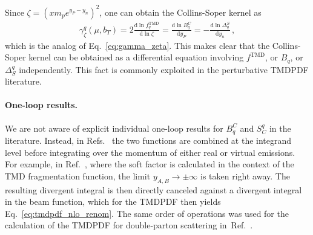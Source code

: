 \documentclass[11pt,a4paper]{article}
\DeclareRobustCommand{\eq}[1]{Eq.~\eqref{eq:#1}}
\DeclareRobustCommand{\mycite}[1]{Ref.~\cite{#1}}
\DeclareRobustCommand{\mycites}[1]{Refs.~\cite{#1}}
\newcommand{\df}{\mathrm{d}}
\newcommand\TMD{\mathrm{TMD}}
\begin{document}
Since $\zeta = (x m_p e^{y_P-y_n})^2$, one can obtain the Collins-Soper kernel as
\begin{align}
 \gamma_\zeta^q(\mu,b_T) = 2 \frac{\df\ln f^\TMD_q}{\df\ln\zeta} = \frac{\df\ln B_q^C}{\df y_P} = -\frac{\df\ln \Delta_q^S}{\df y_n}
\,,\end{align}
which is the analog of \eq{gamma_zeta}.
This makes clear that the Collins-Soper kernel can be obtained as a differential equation involving $f^\TMD$, or $B_q$, or $\Delta_S^q$ independently. This fact is commonly exploited in the perturbative TMDPDF literature.

\paragraph{One-loop results.}
We are not aware of explicit individual one-loop results for $B_q^C$ and $S_C^q$ in the literature.
Instead, in \mycites{Aybat:2011zv,Collins:1350496} the two functions are combined at the integrand level before integrating over the momentum of either real or virtual emissions.
For example, in \mycite{Collins:1350496}, where the soft factor is calculated in the context of the TMD fragmentation function, the limit $y_{A,B} \to \pm\infty$ is taken right away. The resulting divergent integral is then directly canceled against a divergent integral in the beam function, which for the TMDPDF then yields \eq{tmdpdf_nlo_renom}.
The same order of operations was used for the calculation of the TMDPDF for double-parton scattering in~\mycite{Buffing:2017mqm}.
\end{document}
